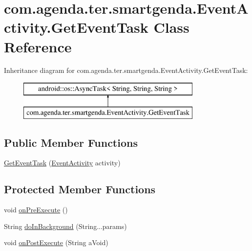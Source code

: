 \hypertarget{classcom_1_1agenda_1_1ter_1_1smartgenda_1_1_event_activity_1_1_get_event_task}{\section{com.\-agenda.\-ter.\-smartgenda.\-Event\-Activity.\-Get\-Event\-Task Class Reference}
\label{classcom_1_1agenda_1_1ter_1_1smartgenda_1_1_event_activity_1_1_get_event_task}
}
Inheritance diagram for com.\-agenda.\-ter.\-smartgenda.\-Event\-Activity.\-Get\-Event\-Task\-:\begin{figure}[H]
\begin{center}
\leavevmode
\includegraphics[height=2.000000cm]{classcom_1_1agenda_1_1ter_1_1smartgenda_1_1_event_activity_1_1_get_event_task}
\end{center}
\end{figure}
\subsection*{Public Member Functions}
\begin{DoxyCompactItemize}
\item 
\hyperlink{classcom_1_1agenda_1_1ter_1_1smartgenda_1_1_event_activity_1_1_get_event_task_aeb014f50a1be2120a3a621451c65e0d8}{Get\-Event\-Task} (\hyperlink{classcom_1_1agenda_1_1ter_1_1smartgenda_1_1_event_activity}{Event\-Activity} activity)
\end{DoxyCompactItemize}
\subsection*{Protected Member Functions}
\begin{DoxyCompactItemize}
\item 
void \hyperlink{classcom_1_1agenda_1_1ter_1_1smartgenda_1_1_event_activity_1_1_get_event_task_a7975aa39775222345f47c1f3252ec041}{on\-Pre\-Execute} ()
\item 
String \hyperlink{classcom_1_1agenda_1_1ter_1_1smartgenda_1_1_event_activity_1_1_get_event_task_aa619f3f4c3b3eb3144f1c197139cf8dd}{do\-In\-Background} (String...\-params)
\item 
void \hyperlink{classcom_1_1agenda_1_1ter_1_1smartgenda_1_1_event_activity_1_1_get_event_task_a05b87b869f9fe585c19c90ffdb26a5b8}{on\-Post\-Execute} (String a\-Void)
\end{DoxyCompactItemize}


